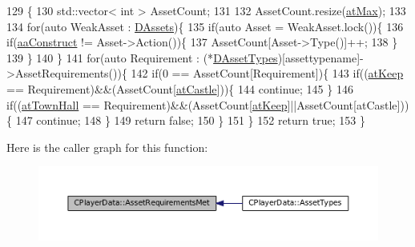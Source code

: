 \begin{DoxyCode}
129                                                                     \{
130     std::vector< int > AssetCount;
131     
132     AssetCount.resize(\hyperlink{GameDataTypes_8h_a5600d4fc433b83300308921974477feca92fbf60b4e5c335160f915b6a1c17c05}{atMax});
133     
134     \textcolor{keywordflow}{for}(\textcolor{keyword}{auto} WeakAsset : \hyperlink{classCPlayerData_a1d7dd355facf52db6242e3554373906c}{DAssets})\{
135         \textcolor{keywordflow}{if}(\textcolor{keyword}{auto} Asset = WeakAsset.lock())\{
136             \textcolor{keywordflow}{if}(\hyperlink{GameDataTypes_8h_ab47668e651a3032cfb9c40ea2d60d670a7ef6b863f66dd7dcc95a199cd758ae1d}{aaConstruct} != Asset->Action())\{
137                 AssetCount[Asset->Type()]++;
138             \}
139         \}
140     \}
141     \textcolor{keywordflow}{for}(\textcolor{keyword}{auto} Requirement : (*\hyperlink{classCPlayerData_ad922f283c60b1c885dac955815ae2b05}{DAssetTypes})[assettypename]->AssetRequirements())\{
142         \textcolor{keywordflow}{if}(0 == AssetCount[Requirement])\{
143             \textcolor{keywordflow}{if}((\hyperlink{GameDataTypes_8h_a5600d4fc433b83300308921974477fecaaed39451bedb0392ad95fbc9c95bef31}{atKeep} == Requirement)&&(AssetCount[\hyperlink{GameDataTypes_8h_a5600d4fc433b83300308921974477feca6727b47855e74f3f7b6e4a96d0c2a42a}{atCastle}]))\{
144                 \textcolor{keywordflow}{continue};               
145             \}
146             \textcolor{keywordflow}{if}((\hyperlink{GameDataTypes_8h_a5600d4fc433b83300308921974477feca5c0fa8a0f367f3358365536d3c7aa321}{atTownHall} == Requirement)&&(AssetCount[\hyperlink{GameDataTypes_8h_a5600d4fc433b83300308921974477fecaaed39451bedb0392ad95fbc9c95bef31}{atKeep}]||AssetCount[atCastle]))\{
147                 \textcolor{keywordflow}{continue};               
148             \}
149             \textcolor{keywordflow}{return} \textcolor{keyword}{false};    
150         \}
151     \}
152     \textcolor{keywordflow}{return} \textcolor{keyword}{true};
153 \}
\end{DoxyCode}
Here is the caller graph for this function\+:
\nopagebreak
\begin{figure}[H]
\begin{center}
\leavevmode
\includegraphics[width=350pt]{classCPlayerData_a21238056db09447e0ed054aafbd953c1_icgraph}
\end{center}
\end{figure}
\hypertarget{classCPlayerData_a9715c8a64e26d669556b029901ec5ab5}{}\label{classCPlayerData_a9715c8a64e26d669556b029901ec5ab5} 
